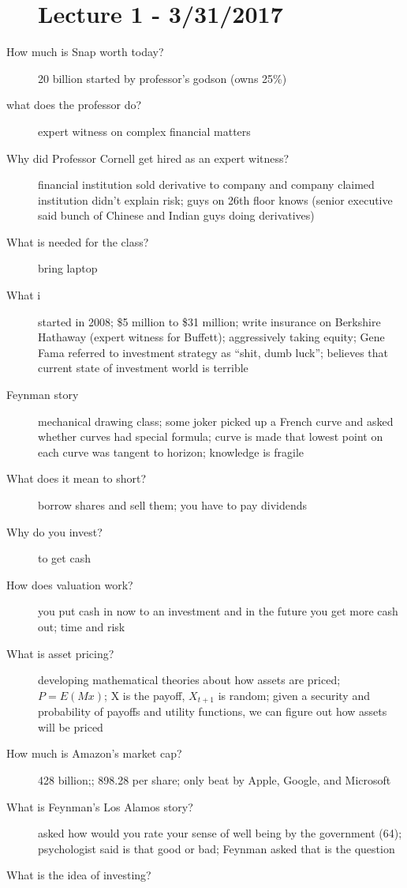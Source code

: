 \documentclass[11pt]{article}
\begin{document}
\begin{description}
\section{Lecture 1 - 3/31/2017}
\item[How much is Snap worth today?]
  20 billion
  started by professor's godson (owns 25\%)
\item[what does the professor do?]
  expert witness on complex financial matters
\item[Why did Professor Cornell get hired as an expert witness?]
  financial institution sold derivative to company and company claimed institution didn't explain risk;
  guys on 26th floor knows (senior executive said bunch of Chinese and Indian guys doing derivatives)
\item[What is needed for the class?]
  bring laptop
\item[What i]
  started in 2008;
  \$5 million to \$31 million;
  write insurance on Berkshire Hathaway (expert witness for Buffett);
  aggressively taking equity;
  Gene Fama referred to investment strategy as ``shit, dumb luck'';
  believes that current state of investment world is terrible
\item[Feynman story]
  mechanical drawing class;
  some joker picked up a French curve and asked whether curves had special formula;
  curve is made that lowest point on each curve was tangent to horizon;
  knowledge is fragile
\item[What does it mean to short?]
  borrow shares and sell them;
  you have to pay dividends
\item[Why do you invest?]
  to get cash
\item[How does valuation work?]
  you put cash in now to an investment and in the future you get more cash out;
  time and risk
\item[What is asset pricing?]
  developing mathematical theories about how assets are priced;
  $P = E(Mx)$;
  X is  the payoff, $X_{t+1}$ is random;
  given a security and probability of payoffs and utility functions, we can figure out how assets will be priced
\item[How much is Amazon's market cap?]
  428 billion;; 898.28 per share;
  only beat by Apple, Google, and Microsoft
\item[What is Feynman's Los Alamos story?]
  asked how would you rate your sense of well being by the government (64);
  psychologist said is that good or bad;
  Feynman asked that is the question
\item[What is the idea of investing?]

\end{description}
\end{document}
